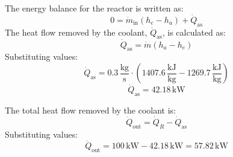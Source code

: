 The energy balance for the reactor is written as:  
\[
0 = \dot{m}_{\text{in}} (h_e - h_a) + \dot{Q}_{\text{as}}
\]  
The heat flow removed by the coolant, \( \dot{Q}_{\text{as}} \), is calculated as:  
\[
\dot{Q}_{\text{as}} = \dot{m} (h_a - h_e)
\]  
Substituting values:  
\[
\dot{Q}_{\text{as}} = 0.3 \, \frac{\text{kg}}{\text{s}} \cdot (1407.6 \, \frac{\text{kJ}}{\text{kg}} - 1269.7 \, \frac{\text{kJ}}{\text{kg}})
\]  
\[
\dot{Q}_{\text{as}} = 42.18 \, \text{kW}
\]  

The total heat flow removed by the coolant is:  
\[
\dot{Q}_{\text{out}} = \dot{Q}_R - \dot{Q}_{\text{as}}
\]  
Substituting values:  
\[
\dot{Q}_{\text{out}} = 100 \, \text{kW} - 42.18 \, \text{kW} = 57.82 \, \text{kW}
\]